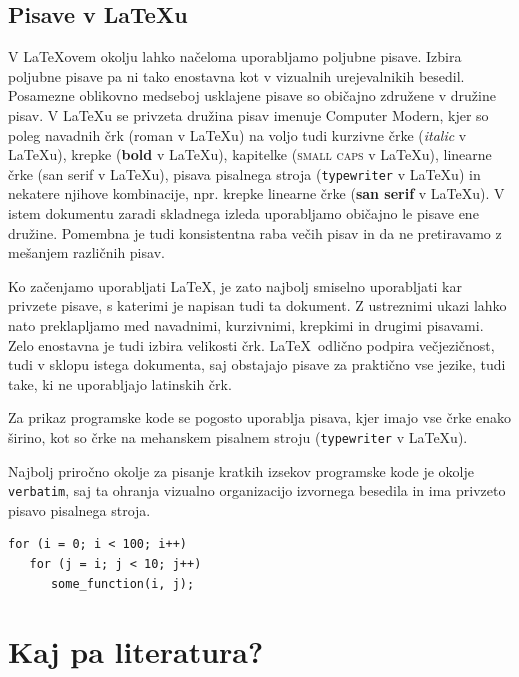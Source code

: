 \documentclass[a4paper,12pt,openright]{book}
\begin{document}
    \section{Pisave v \LaTeX u}

    V  \LaTeX ovem okolju lahko načeloma uporabljamo poljubne pisave.
    Izbira poljubne pisave pa ni tako enostavna kot v vizualnih urejevalnikih besedil.
    Posamezne oblikovno medseboj usklajene pisave so običajno združene v družine pisav.
    V \LaTeX u se privzeta družina pisav imenuje Computer Modern,
    kjer so poleg navadnih črk (roman v \LaTeX u) na voljo tudi kurzivne črke (\textit{italic} v \LaTeX u),
    krepke (\textbf{bold} v \LaTeX u), kapitelke (\textsc{small caps} v \LaTeX u), linearne črke ({\textsf{san serif} v \LaTeX u}), pisava pisalnega stroja (\texttt{typewriter} v \LaTeX u) in nekatere njihove kombinacije, npr. krepke linearne črke
    ({\textbf{\textsf{san serif}} v \LaTeX u}).
    V istem dokumentu zaradi skladnega izleda uporabljamo običajno le pisave ene družine.
    Pomembna je tudi konsistentna raba večih pisav in da ne pretiravamo z mešanjem različnih pisav.

    Ko začenjamo uporabljati \LaTeX, je zato najbolj smiselno uporabljati kar privzete pisave, s katerimi je napisan tudi ta dokument.
    Z ustreznimi ukazi lahko nato preklapljamo med navadnimi, kurzivnimi, krepkimi in drugimi pisavami.
    Zelo enostavna je tudi izbira velikosti črk.
    \LaTeX\  odlično podpira večjezičnost, tudi v sklopu istega dokumenta, saj obstajajo pisave za praktično vse jezike, tudi take, ki ne uporabljajo latinskih črk.

    Za prikaz programske kode se pogosto uporablja pisava, kjer imajo vse črke enako širino, kot so črke na mehanskem pisalnem stroju ({\texttt{typewriter} v \LaTeX u}).

    Najbolj priročno okolje za pisanje kratkih izsekov programske kode je okolje \texttt{verbatim}, saj ta ohranja vizualno organizacijo izvornega besedila in ima privzeto pisavo pisalnega stroja.

    \begin{verbatim}
for (i = 0; i < 100; i++)
   for (j = i; j < 10; j++)
      some_function(i, j);
    \end{verbatim}


    \chapter{Kaj pa literatura?}
    \label{lit}
\end{document}
